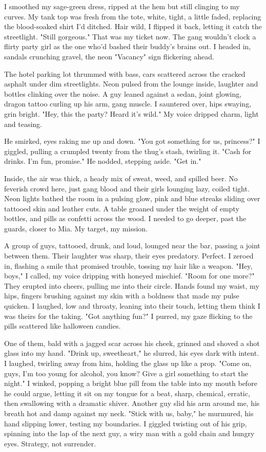 \documentclass{article}
\begin{document}
I smoothed my sage-green dress, ripped at the hem but still clinging to my curves. My tank top was fresh from the tote, white, tight, a little faded, replacing the blood-soaked shirt I'd ditched. Hair wild, I flipped it back, letting it catch the streetlight. "Still gorgeous." That was my ticket now. The gang wouldn't clock a flirty party girl as the one who'd bashed their buddy's brains out. I headed in, sandals crunching gravel, the neon "Vacancy" sign flickering ahead.

The hotel parking lot thrummed with bass, cars scattered across the cracked asphalt under dim streetlights. Neon pulsed from the lounge inside, laughter and bottles clinking over the noise. A guy leaned against a sedan, joint glowing, dragon tattoo curling up his arm, gang muscle. I sauntered over, hips swaying, grin bright. "Hey, this the party? Heard it's wild." My voice dripped charm, light and teasing.

He smirked, eyes raking me up and down. "You got something for us, princess?" I giggled, pulling a crumpled twenty from the thug's stash, twirling it. "Cash for drinks. I'm fun, promise." He nodded, stepping aside. "Get in."

Inside, the air was thick, a heady mix of sweat, weed, and spilled beer. No feverish crowd here, just gang blood and their girls lounging lazy, coiled tight. Neon lights bathed the room in a pulsing glow, pink and blue streaks sliding over tattooed skin and leather cuts. A table groaned under the weight of empty bottles, and pills as confetti across the wood. I needed to go deeper, past the guards, closer to Mia. My target, my mission.

A group of guys, tattooed, drunk, and loud, lounged near the bar, passing a joint between them. Their laughter was sharp, their eyes predatory. Perfect. I zeroed in, flashing a smile that promised trouble, tossing my hair like a weapon. "Hey, boys," I called, my voice dripping with honeyed mischief. "Room for one more?" They erupted into cheers, pulling me into their circle. Hands found my waist, my hips, fingers brushing against my skin with a boldness that made my pulse quicken. I laughed, low and throaty, leaning into their touch, letting them think I was theirs for the taking. "Got anything fun?" I purred, my gaze flicking to the pills scattered like halloween candies.

One of them, bald with a jagged scar across his cheek, grinned and shoved a shot glass into my hand. "Drink up, sweetheart," he slurred, his eyes dark with intent. I laughed, twirling away from him, holding the glass up like a prop. "Come on, guys, I'm too young for alcohol, you know? Give a girl something to start the night." I winked, popping a bright blue pill from the table into my mouth before he could argue, letting it sit on my tongue for a beat, sharp, chemical, erratic, then swallowing with a dramatic shiver. Another guy slid his arm around me, his breath hot and damp against my neck. "Stick with us, baby," he murmured, his hand slipping lower, testing my boundaries. I giggled twisting out of his grip, spinning into the lap of the next guy, a wiry man with a gold chain and hungry eyes. Strategy, not surrender.
\end{document}
